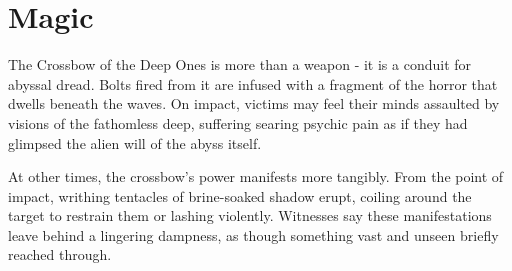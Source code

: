 \section*{Magic}
{\entryfont The Crossbow of the Deep Ones is more than a weapon - it is a conduit for abyssal dread. Bolts fired from it are infused with a fragment of the horror that dwells beneath the waves. On impact, victims may feel their minds assaulted by visions of the fathomless deep, suffering searing psychic pain as if they had glimpsed the alien will of the abyss itself.

At other times, the crossbow's power manifests more tangibly. From the point of impact, writhing tentacles of brine-soaked shadow erupt, coiling around the target to restrain them or lashing violently. Witnesses say these manifestations leave behind a lingering dampness, as though something vast and unseen briefly reached through.}
